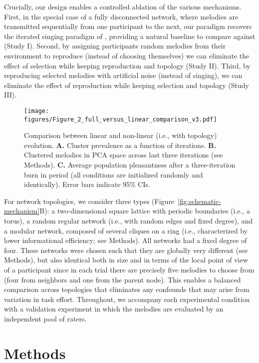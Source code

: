 \documentclass[10pt,letterpaper]{article}
\begin{document}
Crucially, our design enables a controlled ablation of the various mechanisms. First, in the special case of a fully disconnected network, where melodies are transmitted sequentially from one participant to the next, our paradigm recovers the iterated singing paradigm of , providing a natural baseline to compare against (Study I). Second, by assigning participants random melodies from their environment to reproduce (instead of choosing themselves) we can eliminate the effect of selection while keeping reproduction and topology (Study II). Third, by reproducing selected melodies with artificial noise (instead of singing), we can eliminate the effect of reproduction while keeping selection and topology (Study III).
\begin{figure*}[t]
\begin{center}
\texttt{[image: figures/Figure\_2\_full\_versus\_linear\_comparison\_v3.pdf]}
\caption{Comparison between linear and non-linear (i.e., with topology) evolution. \textbf{A.} Cluster prevalence as a function of iterations. \textbf{B.} Clustered melodies in PCA space across last three iterations (see Methods). \textbf{C.} Average population pleasantness after a three-iteration burn in period (all conditions are initialized randomly and identically). Error bars indicate 95\% CIs.}
\label{fig:lin-vs-full}
\end{center}
\end{figure*}

For network topologies, we consider three types (Figure~\ref{fig:schematic-mechanism}B): a two-dimensional square lattice with periodic boundaries (i.e., a torus), a random regular network (i.e., with random edges and fixed degree), and a modular network, composed of several cliques on a ring (i.e., characterized by lower informational efficiency; see Methods). All networks had a fixed degree of four. These networks were chosen such that they are globally very different (see Methods), but also identical both in size and in terms of the local point of view of a participant since in each trial there are precisely five melodies to choose from (four from neighbors and one from the parent node). This enables a balanced comparison across topologies that eliminates any confounds that may arise from variation in task effort. Throughout, we accompany each experimental condition with a validation experiment in which the melodies are evaluated by an independent pool of raters. 

\section{Methods}
\end{document}
